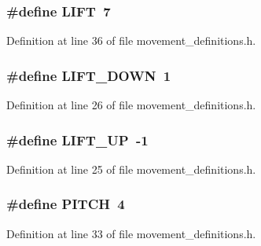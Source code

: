 \subsubsection[{\-L\-I\-F\-T}]{\setlength{\rightskip}{0pt plus 5cm}\#define {\bf \-L\-I\-F\-T}~7}\label{movement__definitions_8h_a87c4281ab0288154c50e55e63f1b5dce}


\-Definition at line 36 of file movement\-\_\-definitions.\-h.

\subsubsection[{\-L\-I\-F\-T\-\_\-\-D\-O\-W\-N}]{\setlength{\rightskip}{0pt plus 5cm}\#define {\bf \-L\-I\-F\-T\-\_\-\-D\-O\-W\-N}~1}\label{movement__definitions_8h_a9aca61b9fb843d370108b53f4058be83}


\-Definition at line 26 of file movement\-\_\-definitions.\-h.

\subsubsection[{\-L\-I\-F\-T\-\_\-\-U\-P}]{\setlength{\rightskip}{0pt plus 5cm}\#define {\bf \-L\-I\-F\-T\-\_\-\-U\-P}~-\/1}\label{movement__definitions_8h_ab1d03fc5bf15953f64274b0bd0648242}


\-Definition at line 25 of file movement\-\_\-definitions.\-h.

\subsubsection[{\-P\-I\-T\-C\-H}]{\setlength{\rightskip}{0pt plus 5cm}\#define {\bf \-P\-I\-T\-C\-H}~4}\label{movement__definitions_8h_acd633835a520a62245ec6cfeb6d00e97}


\-Definition at line 33 of file movement\-\_\-definitions.\-h.


